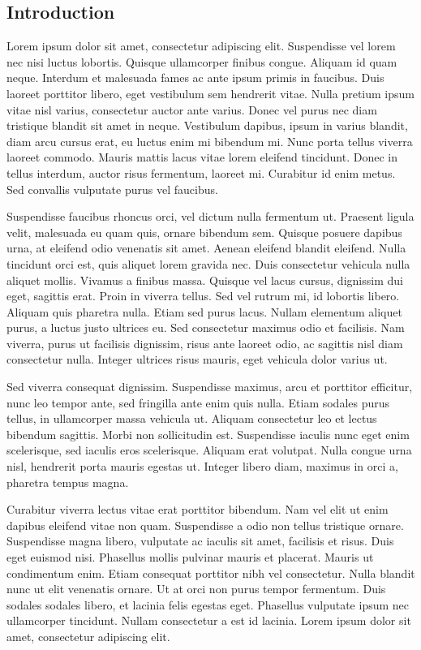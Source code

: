 \documentclass[12pt]{article}
\begin{document}
\begin{multicols}{2}
\section{Introduction}
Lorem ipsum dolor sit amet, consectetur adipiscing elit. Suspendisse vel lorem nec nisi luctus lobortis. Quisque ullamcorper finibus congue. Aliquam id quam neque. Interdum et malesuada fames ac ante ipsum primis in faucibus. Duis laoreet porttitor libero, eget vestibulum sem hendrerit vitae. Nulla pretium ipsum vitae nisl varius, consectetur auctor ante varius. Donec vel purus nec diam tristique blandit sit amet in neque. Vestibulum dapibus, ipsum in varius blandit, diam arcu cursus erat, eu luctus enim mi bibendum mi. Nunc porta tellus viverra laoreet commodo. Mauris mattis lacus vitae lorem eleifend tincidunt. Donec in tellus interdum, auctor risus fermentum, laoreet mi. Curabitur id enim metus. Sed convallis vulputate purus vel faucibus.

Suspendisse faucibus rhoncus orci, vel dictum nulla fermentum ut. Praesent ligula velit, malesuada eu quam quis, ornare bibendum sem. Quisque posuere dapibus urna, at eleifend odio venenatis sit amet. Aenean eleifend blandit eleifend. Nulla tincidunt orci est, quis aliquet lorem gravida nec. Duis consectetur vehicula nulla aliquet mollis. Vivamus a finibus massa. Quisque vel lacus cursus, dignissim dui eget, sagittis erat. Proin in viverra tellus. Sed vel rutrum mi, id lobortis libero. Aliquam quis pharetra nulla. Etiam sed purus lacus. Nullam elementum aliquet purus, a luctus justo ultrices eu. Sed consectetur maximus odio et facilisis. Nam viverra, purus ut facilisis dignissim, risus ante laoreet odio, ac sagittis nisl diam consectetur nulla. Integer ultrices risus mauris, eget vehicula dolor varius ut.

Sed viverra consequat dignissim. Suspendisse maximus, arcu et porttitor efficitur, nunc leo tempor ante, sed fringilla ante enim quis nulla. Etiam sodales purus tellus, in ullamcorper massa vehicula ut. Aliquam consectetur leo et lectus bibendum sagittis. Morbi non sollicitudin est. Suspendisse iaculis nunc eget enim scelerisque, sed iaculis eros scelerisque. Aliquam erat volutpat. Nulla congue urna nisl, hendrerit porta mauris egestas ut. Integer libero diam, maximus in orci a, pharetra tempus magna.

Curabitur viverra lectus vitae erat porttitor bibendum. Nam vel elit ut enim dapibus eleifend vitae non quam. Suspendisse a odio non tellus tristique ornare. Suspendisse magna libero, vulputate ac iaculis sit amet, facilisis et risus. Duis eget euismod nisi. Phasellus mollis pulvinar mauris et placerat. Mauris ut condimentum enim. Etiam consequat porttitor nibh vel consectetur. Nulla blandit nunc ut elit venenatis ornare. Ut at orci non purus tempor fermentum. Duis sodales sodales libero, et lacinia felis egestas eget. Phasellus vulputate ipsum nec ullamcorper tincidunt. Nullam consectetur a est id lacinia. Lorem ipsum dolor sit amet, consectetur adipiscing elit.


\end{multicols}
\end{document}
